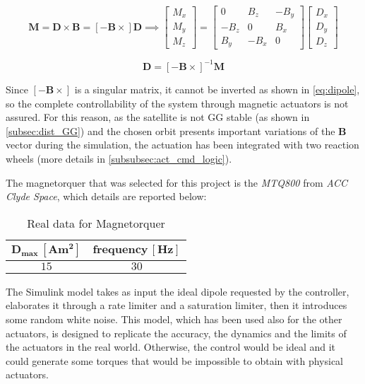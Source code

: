 \begin{equation}
    \boldsymbol{M} = \boldsymbol{D} \times \boldsymbol{B} =
	\left[ -\boldsymbol{B} \times \right] \boldsymbol{D}
	\implies
	\begin{bmatrix}
		M_x \\ M_y \\ M_z
	\end{bmatrix}
	=
	\begin{bmatrix}
		0 & B_z & -B_y \\
		-B_z & 0 & B_x \\
		B_y & -B_x & 0
	\end{bmatrix}
	\begin{bmatrix}
		D_x \\ D_y \\ D_z
	\end{bmatrix}
\end{equation}

\begin{equation} \label{eq:dipole}
	\boldsymbol{D} = \left[ -\boldsymbol{B} \times \right] ^{-1} \boldsymbol{M}
\end{equation}

Since $\left[ -\boldsymbol{B} \times \right]$ is a singular matrix, it cannot be inverted as shown in \autoref{eq:dipole}, so the complete controllability of the system through magnetic actuators is not assured.
For this reason, as the satellite is not GG stable (as shown in \autoref{subsec:dist_GG}) and the chosen orbit presents important variations of the $\boldsymbol{B}$ vector during the simulation, the actuation has been integrated with two reaction wheels (more details in \autoref{subsubsec:act_cmd_logic}).

The magnetorquer that was selected for this project is the \textit{MTQ800} from \textit{ACC Clyde Space}, which details are reported below:
\begin{table}[H]

    \centering
    \begin{tabular}{|c|c|}
    \hline
    $\bm{D_{max} \, [Am^2]}$ & $\bm{frequency \, [Hz]}$ \\
    \hline
    $15$ & $30$ \\
    \hline
    \end{tabular}
    
    \caption{Real data for Magnetorquer}
    \label{table:magnetorquer}
    
\end{table}

The Simulink model takes as input the ideal dipole requested by the controller, elaborates it through a rate limiter and a saturation limiter, then it introduces some random white noise. This model, which has been used also for the other actuators, is designed to replicate the accuracy, the dynamics and the limits of the actuators in the real world. Otherwise, the control would be ideal and it could generate some torques that would be impossible to obtain with physical actuators.


